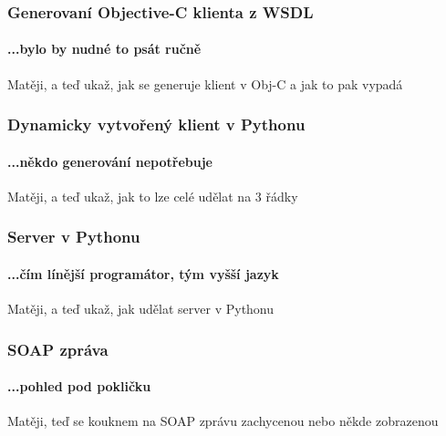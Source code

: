 \documentclass[12pt]{beamer}
\begin{document}
\begin{frame}
  \frametitle{Generovaní Objective-C klienta z WSDL}
  \framesubtitle{...bylo by nudné to psát ručně}

  \begin{example}
    Matěji, a teď ukaž, jak se generuje klient v Obj-C a jak to pak vypadá
  \end{example}
\end{frame}

\begin{frame}
  \frametitle{Dynamicky vytvořený klient v Pythonu}
  \framesubtitle{...někdo generování nepotřebuje}

  \begin{example}
    Matěji, a teď ukaž, jak to lze celé udělat na 3 řádky
  \end{example}
\end{frame}

\begin{frame}
  \frametitle{Server v Pythonu}
  \framesubtitle{...čím línější programátor, tým vyšší jazyk}

  \begin{example}
    Matěji, a teď ukaž, jak udělat server v Pythonu
  \end{example}
\end{frame}

\begin{frame}
  \frametitle{SOAP zpráva}
  \framesubtitle{...pohled pod pokličku}

  \begin{example}
    Matěji, teď se kouknem na SOAP zprávu zachycenou nebo někde zobrazenou
  \end{example}
\end{frame}


\end{document}
